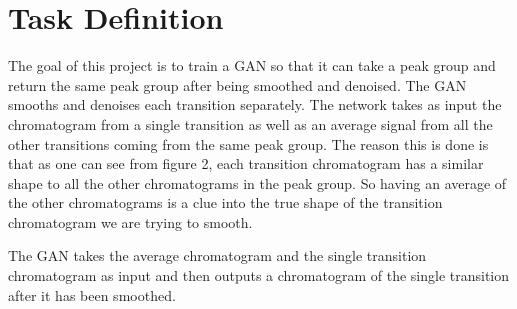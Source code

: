 \documentclass[12pt]{article}
\begin{document}
\section{Task Definition}
The goal of this project is to train a GAN so that it can take a peak group and return the same peak group after being smoothed and denoised.  
The GAN smooths and denoises each transition separately. The network takes as input the chromatogram from a single transition as well as an average signal from all the other transitions coming from the same peak group.  The reason this is done is that as one can see from figure 2, each transition chromatogram has a similar shape to all the other chromatograms in the peak group. So having an average of the other chromatograms is a clue into the true shape of the transition chromatogram we are trying to smooth. 

The GAN takes the average chromatogram and the single transition chromatogram as input and then outputs a chromatogram of the single transition after it has been smoothed. 
\end{document}
